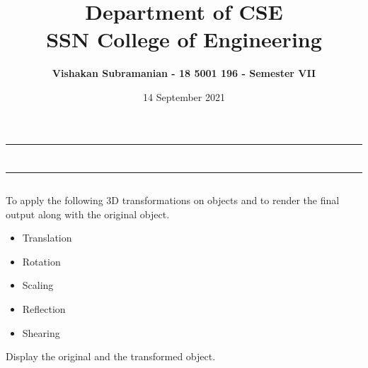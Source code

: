 \documentclass[12pt, a4]{article}
\title{\textbf{Department of CSE\\SSN College of Engineering}}
\author{\textbf{Vishakan Subramanian - 18 5001 196 - Semester VII}}
\date{14 September 2021}
\begin{document}
\maketitle
\hrule
\section*{}
\hrule
\bigskip

\subsection*{}
\subsection*{}
\begin{flushleft}

To apply the following 3D transformations on objects and to render the final output along with the
original object.

\begin{itemize}
	\item Translation
	\item Rotation
	\item Scaling
	\item Reflection
	\item Shearing 
\end{itemize} 

\bigskip
Display the original and the transformed object.
 
\end{flushleft}

\newpage
\subsection*{}
\begin{flushleft}

\end{flushleft}


\newpage
\end{document}
